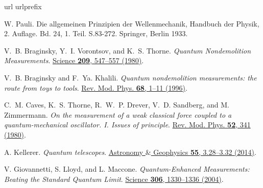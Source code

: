 \documentclass[prl,twocolumn,amsmath,amssymb,bibnotes,aps,longbibliography]{revtex4-1}
\begin{document}
\begin{thebibliography}{99}
\expandafter\ifx\csname url\endcsname\relax
  \def\url#1{\texttt{#1}}\fi
\expandafter\ifx\csname urlprefix\endcsname\relax\def\urlprefix{URL }\fi
\providecommand{\bibinfo}[2]{#2}
\providecommand{\eprint}[2][]{\url{#2}}

\bibinfo{author}{W. Pauli}.
\newblock \bibinfo{title}{Die allgemeinen Prinzipien der Wellenmechanik, Handbuch der Physik, 2. Auflage. Bd. 24, 1. Teil. S.83-272.}
  \bibinfo{publisher}{Springer},
  \bibinfo{address}{Berlin}  \bibinfo{year}{1933}.

\bibinfo{author}{V.~B. Braginsky}, \bibinfo{author}{Y.~I. Vorontsov}, and
\bibinfo{author}{K.~S. Thorne}.
\newblock \emph{\bibinfo{title}{Quantum Nondemolition Measurements}}.
\newblock
  \href{https://science.sciencemag.org/content/209/4456/547}{\bibinfo{journal}{Science} \textbf{\bibinfo{volume}{209}}, \bibinfo{pages}{547--557}
  (\bibinfo{year}{1980})}.
  
\bibinfo{author}{V.~B. Braginsky} and
\bibinfo{author}{F.~Ya. Khalili}.
\newblock \emph{\bibinfo{title}{Quantum nondemolition measurements: the route from toys to tools}}.
\newblock
  \href{https://journals.aps.org/rmp/abstract/10.1103/RevModPhys.68.1}{\bibinfo{journal}{Rev. Mod. Phys.} \textbf{\bibinfo{volume}{68}}, \bibinfo{pages}{1--11}
  (\bibinfo{year}{1996})}.
  
\bibinfo{author}{C.~M. Caves},
\bibinfo{author}{K.~S. Thorne},
\bibinfo{author}{R.~W.~P. Drever},
\bibinfo{author}{V.~D. Sandberg}, and
\bibinfo{author}{M. Zimmermann}.
\newblock \emph{\bibinfo{title}{On the measurement of a weak classical force coupled to a quantum-mechanical oscillator. I. Issues of principle}}.
\newblock
\href{https://journals.aps.org/rmp/abstract/10.1103/RevModPhys.52.341}{\bibinfo{journal}{Rev. Mod. Phys.} \textbf{\bibinfo{volume}{52}}, \bibinfo{pages}{341}
(\bibinfo{year}{1980})}.
  
\bibinfo{author}{A. Kellerer}.
\newblock \emph{\bibinfo{title}{Quantum telescopes}}.
\newblock
  \href{https://academic.oup.com/astrogeo/article/55/3/3.28/239181}{\bibinfo{journal}{Astronomy $\&$ Geophysics} \textbf{\bibinfo{volume}{55}}, \bibinfo{pages}{3.28--3.32}
  (\bibinfo{year}{2014})}.
  
\bibinfo{author}{V. Giovannetti},
\bibinfo{author}{S. Lloyd}, and
\bibinfo{author}{L. Maccone}.
\newblock \emph{\bibinfo{title}{Quantum-Enhanced Measurements: Beating the Standard Quantum Limit}}.
\newblock
\href{https://science.sciencemag.org/content/306/5700/1330.abstract}{\bibinfo{journal}{Science} \textbf{\bibinfo{volume}{306}}, \bibinfo{pages}{1330--1336}
(\bibinfo{year}{2004})}.


\end{thebibliography}
\end{document}

